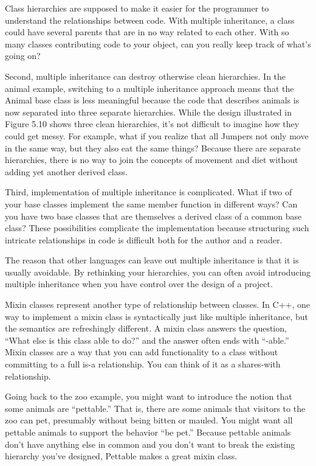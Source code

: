 Class hierarchies are supposed to make it easier for the programmer to understand the relationships between code. With multiple inheritance, a class could have several parents that are in no way related to each other. With so many classes contributing code to your object, can you really keep track of what’s going on?

Second, multiple inheritance can destroy otherwise clean hierarchies. In the animal example, switching to a multiple inheritance approach means that the Animal base class is less meaningful because the code that describes animals is now separated into three separate hierarchies. While the design illustrated in Figure 5.10 shows three clean hierarchies, it’s not difficult to imagine how they could get messy. For example, what if you realize that all Jumpers not only move in the same way, but they also eat the same things? Because there are separate hierarchies, there is no way to join the concepts of movement and diet without adding yet another derived class.

Third, implementation of multiple inheritance is complicated. What if two of your base classes implement the same member function in different ways? Can you have two base classes that are themselves a derived class of a common base class? These possibilities complicate the implementation because structuring such intricate relationships in code is difficult both for the author and a reader.

The reason that other languages can leave out multiple inheritance is that it is usually avoidable. By rethinking your hierarchies, you can often avoid introducing multiple inheritance when you have control over the design of a project.


Mixin classes represent another type of relationship between classes. In C++, one way to implement a mixin class is syntactically just like multiple inheritance, but the semantics are refreshingly different. A mixin class answers the question, “What else is this class able to do?” and the answer often ends with “-able.” Mixin classes are a way that you can add functionality to a class without committing to a full is-a relationship. You can think of it as a shares-with relationship.

Going back to the zoo example, you might want to introduce the notion that some animals are “pettable.” That is, there are some animals that visitors to the zoo can pet, presumably without being bitten or mauled. You might want all pettable animals to support the behavior “be pet.” Because pettable animals don’t have anything else in common and you don’t want to break the existing hierarchy you’ve designed, Pettable makes a great mixin class.

